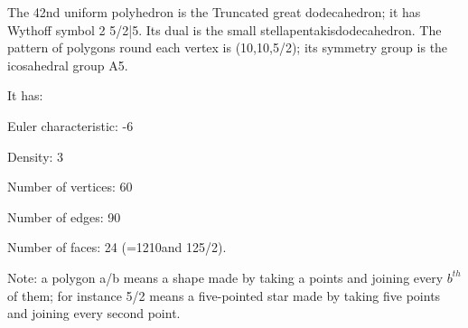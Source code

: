 The 42nd uniform polyhedron is the Truncated great dodecahedron; it has Wythoff symbol 2 5/2|5. Its dual is the small stellapentakisdodecahedron. The pattern of polygons round each vertex is (10,10,5/2); its symmetry group is the icosahedral group A5.\par
It has:\par
Euler characteristic: -6\par
Density: 3\par
Number of vertices: 60\par
Number of edges:  90\par
Number of faces: 24 (=12{10}and 12{5/2}).\par
Note: a polygon a/b means a shape made by taking a points and joining every $b^{th}$  of them; for instance 5/2 means a five-pointed star made by taking five points and joining every second point.